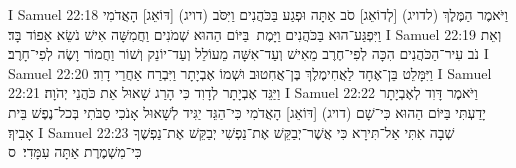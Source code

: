 I Samuel 22:18	וַיֹּאמֶר הַמֶּלֶךְ (לדויג) [לְדוֹאֵג] סֹב אַתָּה וּפְגַע בַּכֹּהֲנִים וַיִּסֹּב (דויג) [דּוֹאֵג] הָאֲדֹמִי וַיִּפְגַּע־הוּא בַּכֹּהֲנִים וַיָּמֶת  בַּיּוֹם הַהוּא שְׁמֹנִים וַחֲמִשָּׁה אִישׁ נֹשֵׂא אֵפוֹד בָּד׃
I Samuel 22:19	וְאֵת נֹב עִיר־הַכֹּהֲנִים הִכָּה לְפִי־חֶרֶב מֵאִישׁ וְעַד־אִשָּׁה מֵעוֹלֵל וְעַד־יוֹנֵק וְשׁוֹר וַחֲמוֹר וָשֶׂה לְפִי־חָרֶב׃
I Samuel 22:20	וַיִּמָּלֵט בֵּן־אֶחָד לַאֲחִימֶלֶךְ בֶּן־אֲחִטוּב וּשְׁמוֹ אֶבְיָתָר וַיִּבְרַח אַחֲרֵי דָוִד׃
I Samuel 22:21	וַיַּגֵּד אֶבְיָתָר לְדָוִד כִּי הָרַג שָׁאוּל אֵת כֹּהֲנֵי יְהֹוָה׃
I Samuel 22:22	וַיֹּאמֶר דָּוִד לְאֶבְיָתָר יָדַעְתִּי בַּיּוֹם הַהוּא כִּי־שָׁם (דויג) [דּוֹאֵג] הָאֲדֹמִי כִּי־הַגֵּד יַגִּיד לְשָׁאוּל אָנֹכִי סַבֹּתִי בְּכל־נֶפֶשׁ בֵּית אָבִיךָ׃
I Samuel 22:23	שְׁבָה אִתִּי אַל־תִּירָא כִּי אֲשֶׁר־יְבַקֵּשׁ אֶת־נַפְשִׁי יְבַקֵּשׁ אֶת־נַפְשֶׁךָ כִּי־מִשְׁמֶרֶת אַתָּה עִמָּדִי׃ {ס}        
